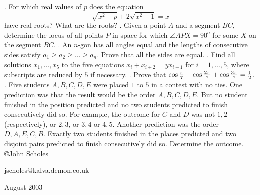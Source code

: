 \nopagenumbers
{}
\vskip 25pt
. For which real values of $p$ does the equation $$\sqrt{x^2-p}+2\sqrt{x^2-1}=x$$ have real roots? What are the roots?
\vskip 12pt
. Given a point $A$ and a segment $BC$, determine the locus of all points $P$ in space for which $\angle APX=90^o$ for some $X$ on the segment $BC$.
\vskip 12pt
. An $n$-gon has all angles equal and the lengths of consecutive sides satisfy $a_1\ge a_2\ge\ldots\ge a_n$. Prove that all the sides are equal.
\vskip 12pt
. Find all solutions $x_1,\ldots,x_5$ to the five equations $x_i+x_{i+2}=yx_{i+1}$ for $i=1,\ldots,5$, where subscripts are reduced by $5$ if necessary.
\vskip 12pt
. Prove that $\cos{\pi\over7}-\cos{2\pi\over7}+\cos{3\pi\over7}={1\over2}$.
\vskip 12pt
. Five students $A,B,C,D,E$ were placed $1$ to $5$ in a contest with no ties. One prediction was that the result would be the order $A,B,C,D,E$. But no student finished in the position predicted and no two students predicted to finish consecutively did so. For example, the outcome for $C$ and $D$ was not $1,2$ (respectively), or $2,3$, or $3,4$ or $4,5$. Another prediction was the order $D,A,E,C,B$. Exactly two students finished in the places predicted and two disjoint pairs predicted to finish consecutively did so. Determine the outcome.
\vskip 20pt
\noindent \copyright John Scholes

\noindent jscholes@kalva.demon.co.uk

 August 2003

\bye
